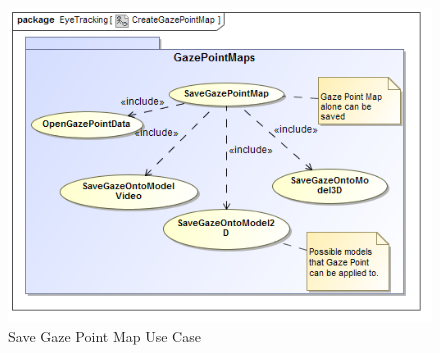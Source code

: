 	\begin{figure}[!ht]
		\centering
		\includegraphics[scale=0.5,width=15cm,keepaspectratio]{Diagrams/Use_Case_Diagram__CreateGazePointMap.png}\newline
		\caption{Save Gaze Point Map Use Case}
	\end{figure}		
		
	
